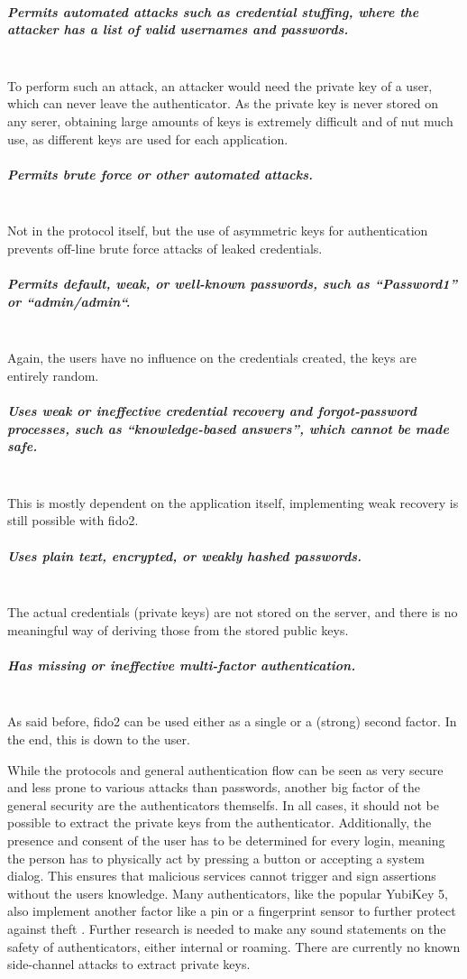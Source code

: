 \noindent\subparagraph{Permits automated attacks such as credential stuffing, where the attacker has a list of valid usernames and passwords.}\\To perform such an attack, an attacker would need the private key of a user, which can never leave the authenticator. As the private key is never stored on any serer, obtaining large amounts of keys is extremely difficult and of nut much use, as different keys are used for each application.

\noindent\subparagraph{Permits brute force or other automated attacks.}\\Not in the protocol itself, but the use of asymmetric keys for authentication prevents off-line brute force attacks of leaked credentials.

\noindent\subparagraph{Permits default, weak, or well-known passwords, such as “Password1” or “admin/admin“.}\\Again, the users have no influence on the credentials created, the keys are entirely random.

\noindent\subparagraph{Uses weak or ineffective credential recovery and forgot-password processes, such as “knowledge-based answers”, which cannot be made safe.}\\This is mostly dependent on the application itself, implementing weak recovery is still possible with \ac{fido2}.

\noindent\subparagraph{Uses plain text, encrypted, or weakly hashed passwords.}\\The actual credentials (private keys) are not stored on the server, and there is no meaningful way of deriving those from the stored public keys.

\noindent\subparagraph{Has missing or ineffective multi-factor authentication.}\\As said before, \ac{fido2} can be used either as a single or a (strong) second factor. In the end, this is down to the user.

\noindent While the protocols and general authentication flow can be seen as very secure and less prone to various attacks than passwords, another big factor of the general security are the authenticators themselfs. In all cases, it should not be possible to extract the private keys from the authenticator. Additionally, the presence and consent of the user has to be determined for every login, meaning the person has to physically act by pressing a button or accepting a system dialog. This ensures that malicious services cannot trigger and sign assertions without the users knowledge. Many authenticators, like the popular YubiKey 5, also implement another factor like a \ac{pin} or a fingerprint sensor to further protect against theft \cite{yubikey_5_nfc,dunkelberger2018}.
Further research is needed to make any sound statements on the safety of authenticators, either internal or roaming. There are currently no known side-channel attacks to extract private keys.\\


